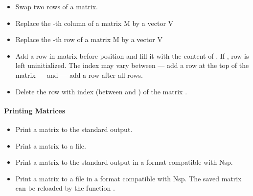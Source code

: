 \begin{itemize}
\item {}
  \sshortdescribe Swap two rows of a matrix.  

\item {}
  \sshortdescribe Replace the -th column of a matrix M by a vector V 

\item {}
  \sshortdescribe Replace the -th row of a matrix M by a vector V  

\item {}
  \sshortdescribe Add a row in matrix  before position  and fill
  it with the content of . If , row  is left
  uninitialized. The index  may vary between  --- add a row at the
  top of the matrix --- and  --- add a row after all rows.

\item {}
  \sshortdescribe Delete the row with index  (between  and
  ) of the matrix .

\end{itemize}

\paragraph{Printing Matrices}

\begin{itemize}
\item {}
  \sshortdescribe Print a matrix to the standard output.  

\item {}
  \sshortdescribe Print a matrix to a file.

\item {}
  \sshortdescribe Print a matrix to the standard output in a format
  compatible with Nsp.  

\item {}
  \sshortdescribe Print a matrix to a file in a format compatible with Nsp. The
  saved matrix can be reloaded by the function
  .
\end{itemize}

